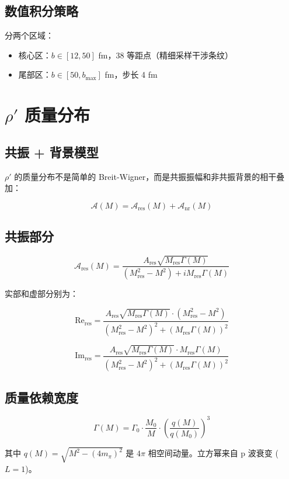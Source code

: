 \documentclass[11pt,a4paper,UTF8]{ctexart}
\begin{document}
\subsection{数值积分策略}

分两个区域：
\begin{itemize}[leftmargin=2em]
    \item 核心区：$b \in [12, 50]$ fm，38 等距点（精细采样干涉条纹）
    \item 尾部区：$b \in [50, b_{\text{max}}]$ fm，步长 4 fm
\end{itemize}

\section{$\rho'$ 质量分布}

\subsection{共振 + 背景模型}

$\rho'$ 的质量分布不是简单的 Breit-Wigner，而是共振振幅和非共振背景的相干叠加：

\[
\mathcal{A}(M) = \mathcal{A}_{\text{res}}(M) + \mathcal{A}_{\text{nr}}(M)
\]

\subsection{共振部分}

\[
\mathcal{A}_{\text{res}}(M) = \frac{A_{\text{res}} \sqrt{M_{\text{res}} \Gamma(M)}}{(M_{\text{res}}^2 - M^2) + i M_{\text{res}} \Gamma(M)}
\]

实部和虚部分别为：

\[
\text{Re}_{\text{res}} = \frac{A_{\text{res}} \sqrt{M_{\text{res}} \Gamma(M)} \cdot (M_{\text{res}}^2 - M^2)}{(M_{\text{res}}^2 - M^2)^2 + (M_{\text{res}} \Gamma(M))^2}
\]

\[
\text{Im}_{\text{res}} = \frac{A_{\text{res}} \sqrt{M_{\text{res}} \Gamma(M)} \cdot M_{\text{res}} \Gamma(M)}{(M_{\text{res}}^2 - M^2)^2 + (M_{\text{res}} \Gamma(M))^2}
\]

\subsection{质量依赖宽度}

\[
\Gamma(M) = \Gamma_0 \cdot \frac{M_0}{M} \cdot \left( \frac{q(M)}{q(M_0)} \right)^3
\]

其中 $q(M) = \sqrt{M^2 - (4m_\pi)^2}$ 是 $4\pi$ 相空间动量。立方幂来自 p 波衰变 ($L=1$)。
\end{document}
